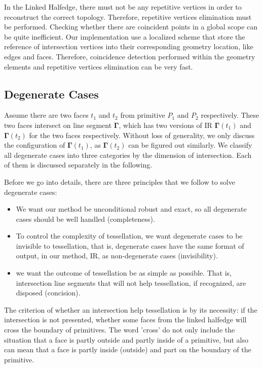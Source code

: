 \documentclass[10pt,journal,compsoc]{IEEEtran}
\begin{document}
In the Linked Halfedge, there must not be any repetitive vertices in order to reconstruct the correct topology. Therefore, repetitive vertices elimination must be performed. Checking whether there are coincident points in a global scope can be quite inefficient. Our implementation use a localized scheme that store the reference of intersection vertices into their corresponding geometry location, like edges and faces. Therefore, coincidence detection performed within the geometry elements and repetitive vertices elimination can be very fast.

\subsection{Degenerate Cases}
\label{sec:degenerate}

Assume there are two faces $t_1$ and $t_2$ from primitive $P_1$ and $P_2$ respectively. These two faces intersect on line segment ${\boldsymbol{\Gamma}}$, which has two versions of IR ${\boldsymbol{\Gamma}}(t_1)$ and ${\boldsymbol{\Gamma}}(t_2)$ for the two faces respectively. Without loss of generality, we only discuss the configuration of ${\boldsymbol{\Gamma}}(t_1)$, as ${\boldsymbol{\Gamma}}(t_2)$ can be figured out similarly. We classify all degenerate cases into three categories by the dimension of intersection. Each of them is discussed separately in the following.

Before we go into details, there are three principles that we follow to solve degenerate cases:
\begin{itemize}
\item We want our method be unconditional robust and exact, so all degenerate cases should be well handled (completeness).
  \item To control the complexity of tessellation, we want degenerate cases to be invisible to tessellation, that is, degenerate cases have the same format of output, in our method, IR, as non-degenerate cases (invisibility).
  \item we want the outcome of tessellation be as simple as possible. That is, intersection line segments that will not help tessellation, if recognized, are disposed (concision).
\end{itemize}
The criterion of whether an intersection help tessellation is by its necessity: if the intersection is not presented, whether some faces from the linked halfedge will cross the boundary of primitives. The word 'cross' do not only include the situation that a face is partly outside and partly inside of a primitive, but also can mean that a face is partly inside (outside) and part on the boundary of the primitive.
\end{document}
